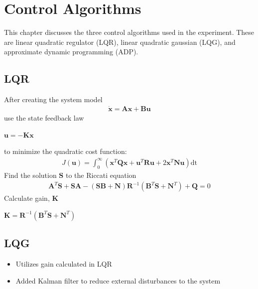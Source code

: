 \chapter{Control Algorithms}
\label{ch: Chapter3}
This chapter discusses the three control algorithms used in the experiment.  These are linear quadratic regulator (LQR), linear quadratic gaussian (LQG), and approximate dynamic programming (ADP).
\section{LQR}

    After creating the system model
    \begin{align*}
        \dot{\mathbf{x}} = \mathbf{A}\mathbf{x} + \mathbf{B}\mathbf{u}
    \end{align*}
    use the state feedback law
    \begin{center}
        $\mathbf{u} = -\mathbf{K}\mathbf{x}$
    \end{center}
    to minimize the quadratic cost function:
    \begin{align*}
        J(\mathbf{u}) = \int_0^\infty (\mathbf{x}^T\mathbf{Q}\mathbf{x} + \mathbf{u}^T\mathbf{R}\mathbf{u} + 2\mathbf{x}^T\mathbf{N}\mathbf{u})\mathrm{dt}
    \end{align*}
    Find the solution $\mathbf{S}$ to the Riccati equation
    \begin{align*}
        \mathbf{A}^T\mathbf{S}+\mathbf{SA}-(\mathbf{SB}+\mathbf{N})\mathbf{R}^{-1}(\mathbf{B}^T\mathbf{S}+\mathbf{N}^T)+\mathbf{Q}=0
    \end{align*}    
    Calculate gain, $\mathbf{K}$
    \begin{center}
        $\mathbf{K}=\mathbf{R}^{-1}(\mathbf{B}^T\mathbf{S}+\mathbf{N}^T)$
    \end{center}

\section{LQG}

\begin{itemize}   
    \item Utilizes gain calculated in LQR
    \item Added Kalman filter to reduce external disturbances to the system
\end{itemize}
